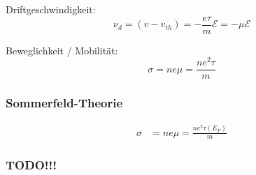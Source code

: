 Driftgeschwindigkeit:
\begin{equation*}
    \nu_d = (v-v_{th}) = -\frac{e \tau}{m} \mathcal{E} = -\mu \mathcal{E}
\end{equation*}

Beweglichkeit / Mobilität:
\begin{equation*}
    \sigma = n e \mu = \frac{n e^2 \tau}{m}
\end{equation*}

\subsubsection*{Sommerfeld-Theorie}

\begin{equation*}
    \begin{aligned}
        \sigma &= n e \mu = \frac{n e^2 \tau(E_F)}{m}
    \end{aligned}
\end{equation*}

\subsubsection*{TODO!!!}